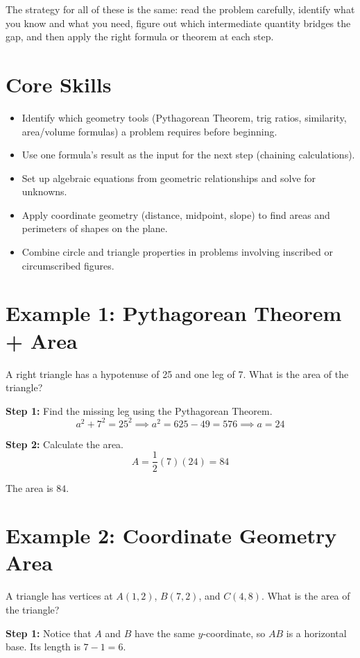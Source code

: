 \documentclass[14pt]{extarticle}
\begin{document}
The strategy for all of these is the same: read the problem carefully, identify what you know and what you need, figure out which intermediate quantity bridges the gap, and then apply the right formula or theorem at each step.

\section*{Core Skills}
\begin{itemize}
  \item Identify which geometry tools (Pythagorean Theorem, trig ratios, similarity, area/volume formulas) a problem requires before beginning.
  \item Use one formula's result as the input for the next step (chaining calculations).
  \item Set up algebraic equations from geometric relationships and solve for unknowns.
  \item Apply coordinate geometry (distance, midpoint, slope) to find areas and perimeters of shapes on the plane.
  \item Combine circle and triangle properties in problems involving inscribed or circumscribed figures.
\end{itemize}

\section*{Example 1: Pythagorean Theorem + Area}

A right triangle has a hypotenuse of 25 and one leg of 7. What is the area of the triangle?

\textbf{Step 1:} Find the missing leg using the Pythagorean Theorem.
\[
a^2 + 7^2 = 25^2 \implies a^2 = 625 - 49 = 576 \implies a = 24
\]

\textbf{Step 2:} Calculate the area.
\[
A = \frac{1}{2}(7)(24) = 84
\]

The area is \(\boxed{84}\).

\section*{Example 2: Coordinate Geometry Area}

A triangle has vertices at \(A(1, 2)\), \(B(7, 2)\), and \(C(4, 8)\). What is the area of the triangle?

\textbf{Step 1:} Notice that \(A\) and \(B\) have the same \(y\)-coordinate, so \(AB\) is a horizontal base. Its length is \(7 - 1 = 6\).
\end{document}
